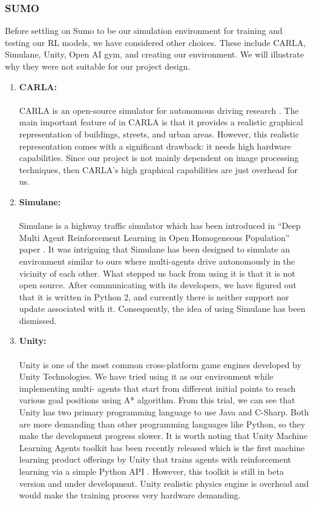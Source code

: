 \subsubsection{SUMO}
Before settling on Sumo to be our simulation environment for training and testing our RL models, we have considered other choices. These include CARLA, Simulane, Unity, Open AI gym, and creating our environment. We will illustrate why they were not suitable for our project design.
\begin{enumerate}
    \item \textbf{CARLA:} \\ \\
    CARLA is an open-source simulator for autonomous driving research \cite{carla_software}. The main important feature of in CARLA is that it provides a realistic graphical representation of buildings, streets, and urban areas.  However, this realistic representation comes with a significant drawback: it needs high hardware capabilities. Since our project is not mainly dependent on image processing techniques, then CARLA’s high graphical capabilities are just overhead for us.
    \item \textbf{Simulane:} \\ \\
    Simulane is a highway traffic simulator which has been introduced in “Deep Multi Agent Reinforcement Learning in Open Homogeneous Population” paper \cite{simulane_paper}.  It was intriguing that Simulane has been designed to simulate an environment similar to ours where multi-agents drive autonomously in the vicinity of each other. What stepped us back from using it is that it is not open source. After communicating with its developers, we have figured out that it is written in Python 2, and currently there is neither support nor update associated with it. Consequently, the idea of using Simulane has been dismissed.
    \item \textbf{Unity:} \\ \\
    Unity is one of the most common cross-platform game engines developed by Unity Technologies. We have tried using it as our environment while implementing multi- agents that start from different initial points to reach various goal positions using A* algorithm. From this trial, we can see that Unity has two primary programming language to use Java and C-Sharp. Both are more demanding than other programming languages like Python, so they make the development progress slower. It is worth noting that Unity Machine Learning Agents toolkit has been recently released which is the first machine learning product offerings by Unity that trains agents with reinforcement learning via a simple Python API \cite{unity}. However, this toolkit is still in beta version and under development. Unity realistic physics engine is overhead and would make the training process very hardware demanding.

\end{enumerate}
